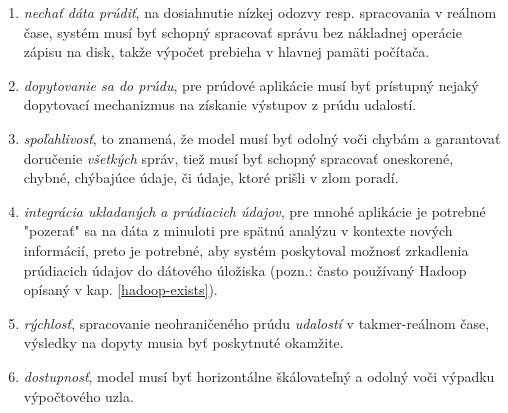 \begin{enumerate}
	\item \textit{nechať dáta prúdiť}, na dosiahnutie nízkej odozvy resp. spracovania v reálnom čase, systém musí byť schopný spracovať správu bez nákladnej operácie zápisu na disk, takže výpočet prebieha v hlavnej pamäti počítača.
	\item \textit{dopytovanie sa do prúdu}, pre prúdové aplikácie musí byť prístupný nejaký dopytovací mechanizmus na získanie výstupov z prúdu udalostí.
	\item \textit{spoľahlivosť}, to znamená, že model musí byť odolný voči chybám a garantovať doručenie \textit{všetkých} správ, tiež musí byť schopný spracovať oneskorené, chybné, chýbajúce údaje, či údaje, ktoré prišli v zlom poradí.
	\item \textit{integrácia ukladaných a prúdiacich údajov}, pre mnohé aplikácie je potrebné "pozerať" sa na dáta z minuloti pre spätnú analýzu v kontexte nových informácií, preto je potrebné, aby systém poskytoval možnosť zrkadlenia prúdiacich údajov do dátového úložiska (pozn.: často používaný Hadoop opísaný v kap. \ref{hadoop-exists}).
	\item \textit{rýchlosť}, spracovanie neohraničeného prúdu \textit{udalostí} v takmer-reálnom čase, výsledky na dopyty musia byť poskytnuté okamžite.
	\item \textit{dostupnosť}, model musí byť horizontálne škálovateľný a odolný voči výpadku výpočtového uzla.
\end{enumerate}

\par


